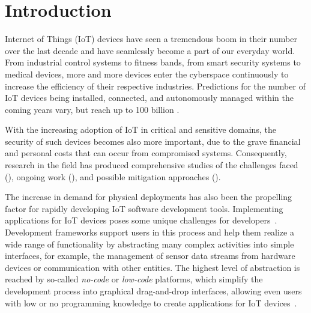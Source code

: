 \section{Introduction}
\label{sec:intro}




Internet of Things (IoT) devices have seen a tremendous boom in their number over the last decade and have seamlessly become a part of our everyday world. 
From industrial control systems to fitness bands, from smart security systems to medical devices, more and more devices enter the cyberspace continuously to increase the efficiency of their respective industries. 
Predictions for the number of IoT devices being installed, connected, and autonomously managed within the coming years vary, but reach up to 100 billion \cite{huawei}. 

With the increasing adoption of IoT in critical and sensitive domains, the security of such devices becomes also more important, due to the grave financial and personal costs that can occur from compromised systems.
Consequently, research in the field has produced comprehensive studies of the challenges faced (\cite{Ahmad_Alsmadi21_ml_approaches_iot_security,Hassija19_iot_security_survey,Zhang14_Iot_security_challenegs_opportunities}), ongoing work (\cite{Mahmoud15_iot_security,MohamadNoor_Hassan19_iot_security_research}), and possible mitigation approaches (\cite{AlGaradi20_survey_ml_dl_iot,Chatterjee22_iot_anomaly_detection,Williams22_survey_security_iot,Xiao18_iot_security_techniques_ml}).



The increase in demand for physical deployments has also been the propelling factor for rapidly developing IoT software development tools. 
Implementing applications for IoT devices poses some unique challenges for developers~\cite{Udoh18_developing_iot_applications}.
Development frameworks support users in this process and help them realize a wide range of functionality by abstracting many complex activities into simple interfaces, for example, the management of sensor data streams from hardware devices or communication with other entities.
The highest level of abstraction is reached by so-called \textit{no-code} or \textit{low-code} platforms, which simplify the development process into graphical drag-and-drop interfaces, allowing even users with low or no programming knowledge to create applications for IoT devices~\cite{Bock21_low_code_platform,Rokis22_challenges_of_low_code}.

